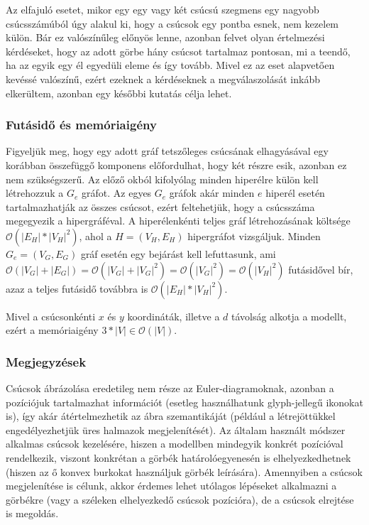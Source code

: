 \begin{note}
Az elfajuló esetet, mikor egy egy vagy két csúcsú szegmens egy nagyobb csúcsszámúból úgy alakul ki, hogy a csúcsok egy pontba esnek, nem kezelem külön. Bár ez valószínűleg előnyös lenne, azonban felvet olyan értelmezési kérdéseket, hogy az adott görbe hány csúcsot tartalmaz pontosan, mi a teendő, ha az egyik egy él egyedüli eleme és így tovább. Mivel ez az eset alapvetően kevéssé valószínű, ezért ezeknek a kérdéseknek a megválaszolását inkább elkerültem, azonban egy későbbi kutatás célja lehet.
\end{note}

\subsubsection{Futásidő és memóriaigény}

Figyeljük meg, hogy egy adott gráf tetszőleges csúcsának elhagyásával egy korábban összefüggő komponens előfordulhat, hogy két részre esik, azonban ez nem szükségszerű. Az előző okból kifolyólag minden hiperélre külön kell létrehozzuk a $G_e$ gráfot. Az egyes $G_e$ gráfok akár minden $e$ hiperél esetén tartalmazhatják az összes csúcsot, ezért feltehetjük, hogy a csúcsszáma megegyezik a hipergráféval. A hiperélenkénti teljes gráf létrehozásának költsége $\mathcal{O}(|E_H|*|V_H|^2)$, ahol a $H=(V_H,E_H)$ hipergráfot vizsgáljuk. Minden $G_e=(V_G,E_G)$ gráf esetén egy bejárást kell lefuttasunk, ami $\mathcal{O}(|V_G|+|E_G|) = \mathcal{O}(|V_G| + |V_G|^2) = \mathcal{O}(|V_G|^2) = \mathcal{O}(|V_H|^2)$ futásidővel bír, azaz a teljes futásidő továbbra is $\mathcal{O}(|E_H|*|V_H|^2)$.


Mivel a csúcsonkénti $x$ és $y$ koordináták, illetve a $d$ távolság alkotja a modellt, ezért a memóriaigény $3*|V| \in \mathcal{O}(|V|)$.

\subsubsection{Megjegyzések}

Csúcsok ábrázolása eredetileg nem része az Euler-diagramoknak, azonban a pozíciójuk tartalmazhat információt (esetleg használhatunk  glyph-jellegű ikonokat is), így akár átértelmezhetik az ábra szemantikáját (például a létrejöttükkel engedélyezhetjük üres halmazok megjelenítését). Az általam használt módszer alkalmas csúcsok kezelésére, hiszen a modellben mindegyik konkrét pozícióval rendelkezik, viszont konkrétan a görbék határolóegyenesén is elhelyezkedhetnek (hiszen az ő konvex burkokat használjuk görbék leírására). Amennyiben a csúcsok megjelenítése is célunk, akkor érdemes lehet utólagos lépéseket alkalmazni a görbékre (vagy a széleken elhelyezkedő csúcsok pozícióra), de a csúcsok elrejtése is megoldás.


